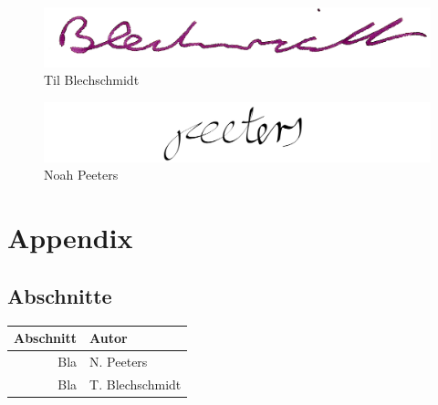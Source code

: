 \documentclass[a4paper]{article}
\begin{document}
        
        \begin{figure}[H]
            \centering
            \begin{minipage}{.5\textwidth}
                \centering
                \includegraphics[width=\textwidth]{assets/signature_tilb.png}
                Til Blechschmidt
            \end{minipage}%
            \begin{minipage}{.5\textwidth}
                \centering
                \includegraphics[width=\textwidth]{assets/signature_noahp.png}
                Noah Peeters
            \end{minipage}
        \end{figure}
        \clearpage
    
    \clearpage
    \section{Appendix}
        \printglossary[type=\acronymtype]
        \printglossary
        
        \clearpage
        \nocite{*}
        
        
        
        \clearpage
        
        \subsection{Abschnitte}
            \begin{tabular}{rl}
              Abschnitt & Autor \\
              \hline
              Bla & N. Peeters\\
              Bla & T. Blechschmidt
            \end{tabular}
        
%                
\end{document}
